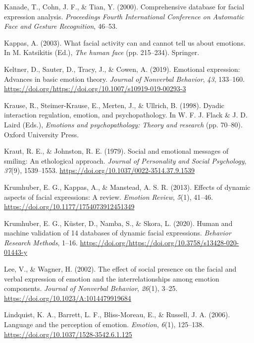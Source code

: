 \documentclass[
  english,
  man]{apa7}
\newlength{\cslhangindent}
\newenvironment{cslreferences}%
  {\setlength{\parindent}{0pt}%
  \everypar{\setlength{\hangindent}{\cslhangindent}}\ignorespaces}%
  {\par}
\begin{document}
\begin{cslreferences}
\leavevmode\hypertarget{ref-kanade2000comprehensive}{}%
Kanade, T., Cohn, J. F., \& Tian, Y. (2000). Comprehensive database for facial expression analysis. \emph{Proceedings Fourth International Conference on Automatic Face and Gesture Recognition}, 46--53.

\leavevmode\hypertarget{ref-kappas2003facial}{}%
Kappas, A. (2003). What facial activity can and cannot tell us about emotions. In M. Katsikitis (Ed.), \emph{The human face} (pp. 215--234). Springer.

\leavevmode\hypertarget{ref-keltner2019emotional}{}%
Keltner, D., Sauter, D., Tracy, J., \& Cowen, A. (2019). Emotional expression: Advances in basic emotion theory. \emph{Journal of Nonverbal Behavior}, \emph{43}, 133--160. \url{https://doi.org/https://doi.org/10.1007/s10919-019-00293-3}

\leavevmode\hypertarget{ref-krause1998dyadic}{}%
Krause, R., Steimer-Krause, E., Merten, J., \& Ullrich, B. (1998). Dyadic interaction regulation, emotion, and psychopathology. In W. F. J. Flack \& J. D. Laird (Eds.), \emph{Emotions and psychopathology: Theory and research} (pp. 70--80). Oxford University Press.

\leavevmode\hypertarget{ref-kraut1979social}{}%
Kraut, R. E., \& Johnston, R. E. (1979). Social and emotional messages of smiling: An ethological approach. \emph{Journal of Personality and Social Psychology}, \emph{37}(9), 1539--1553. \url{https://doi.org/10.1037/0022-3514.37.9.1539}

\leavevmode\hypertarget{ref-krumhuber2013effects}{}%
Krumhuber, E. G., Kappas, A., \& Manstead, A. S. R. (2013). Effects of dynamic aspects of facial expressions: A review. \emph{Emotion Review}, \emph{5}(1), 41--46. \url{https://doi.org/10.1177/1754073912451349}

\leavevmode\hypertarget{ref-krumhuber2020human}{}%
Krumhuber, E. G., Küster, D., Namba, S., \& Skora, L. (2020). Human and machine validation of 14 databases of dynamic facial expressions. \emph{Behavior Research Methods}, 1--16. \url{https://doi.org/https://doi.org/10.3758/s13428-020-01443-y}

\leavevmode\hypertarget{ref-lee2002effect}{}%
Lee, V., \& Wagner, H. (2002). The effect of social presence on the facial and verbal expression of emotion and the interrelationships among emotion components. \emph{Journal of Nonverbal Behavior}, \emph{26}(1), 3--25. \url{https://doi.org/10.1023/A:1014479919684}

\leavevmode\hypertarget{ref-lindquist2006language}{}%
Lindquist, K. A., Barrett, L. F., Bliss-Moreau, E., \& Russell, J. A. (2006). Language and the perception of emotion. \emph{Emotion}, \emph{6}(1), 125--138. \url{https://doi.org/10.1037/1528-3542.6.1.125}


\end{cslreferences}
\end{document}
